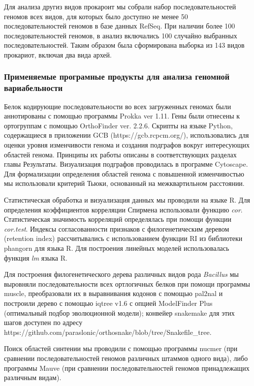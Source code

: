 Для анализа другиз видов прокароит мы собрали набор последовательностей геномов всех видов, для которых было доступно не менее 50 последовательностей геномов в базе данных RefSeq. При наличии более 100 последовательностей геномов, в анализ включались 100 случайно выбранных последовательностей. Таким образом была сформирована выборка из 143 видов прокариот, включая два вида архей.

\subsubsection*{Применяемые програмные продукты для анализа геномной вариабельности}
Белок кодирующие последовательности во всех загруженных геномах были аннотированы с помощью программы Prokka ver 1.11. Гены были отнесены к ортогруппам с помощью OrthoFinder ver. 2.2.6. Скрипты на языке Python, содержащиеся в приложении GCB (https://gcb.rcpcm.org/), использовались для оценки уровня изменчивости генома и создания подграфов вокруг интересующих областей генома. Принципы их работы описаны в соответствующих разделах главы Результаты. Визуализация подграфов проводилась в программе Cytoscape. Для формализации определения областей генома с повышенной изменчивостью мы использовали критерий Тьюки, основанный на межквартильном расстоянии.

Статистическая обработка и визуализация данных мы проводили на языке R. Для определения коэффициентов корреляции Спирмена использовали функцию \textit{cor}. Статистическая значимость корреляций определялась при помощи функции \textit{cor.test}. Индексы согласованности признаков с филогенетическим деревом (retention index) рассчитывались с использованием функции RI из библиотеки phangorn для языка R. Для построения линейных моделей использовалась функция \textit{lm} языка R.

Для построения филогенетического дерева различных видов рода \textit{Bacillus} мы выровняли последовательности всех ортлогичных белков при помощи программы muscle, преобразовали их в выравнивания кодонов с помощью pal2nal и построили дерево с помощью iqtree v1.6 с опцией ModelFinder Plus (оптимальный подбор эволюционной модели); конвейер snakemake для этих шагов доступен по адресу https://github.com/paraslonic/orthosnake/blob/tree/Snakefile\_tree. 

Поиск областей синтении мы проводили с помощью программы nucmer (при сравнении последовательностей геномов различных штаммов одного вида), либо программы Mauve (при сравнении последовательностей геномов принадлежащих различным видам).

